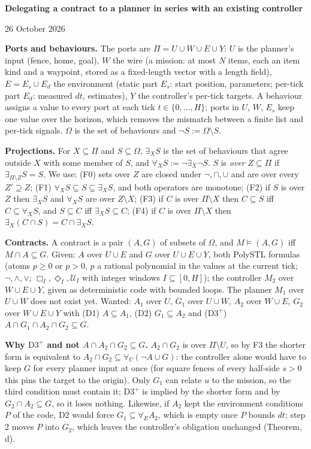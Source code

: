 \documentclass[10pt]{article}
\newcommand{\sect}[1]{\par\smallskip{\large\bfseries #1}\par\smallskip}
\newcommand{\ex}{\exists}
\newcommand{\fa}{\forall}
\newcommand{\Dthree}{\mathrm{D3}^{+}}
\begin{document}
\small
{\Large\bfseries Delegating a contract to a planner in series with an existing controller}\par 26 October 2026

\sect{1\quad Setting}

\textbf{Ports and behaviours.} The ports are $\Pi=U\cup W\cup E\cup Y$: $U$ is the planner's input (fence, home, goal), $W$ the wire (a mission: at most $N$ items, each an item kind and a waypoint, stored as a fixed-length vector with a length field), $E=E_s\cup E_d$ the environment (static part $E_s$: start position, parameters; per-tick part $E_d$: measured $dt$, estimates), $Y$ the controller's per-tick targets. A behaviour assigns a value to every port at each tick $t\in\{0,\dots,H\}$; ports in $U$, $W$, $E_s$ keep one value over the horizon, which removes the mismatch between a finite list and per-tick signals. $\Omega$ is the set of behaviours and $\lnot S:=\Omega\setminus S$.

\textbf{Projections.} For $X\subseteq\Pi$ and $S\subseteq\Omega$, $\ex_X S$ is the set of behaviours that agree outside $X$ with some member of $S$, and $\fa_X S:=\lnot\ex_X\lnot S$. $S$ is \emph{over} $Z\subseteq\Pi$ if $\ex_{\Pi\setminus Z}S=S$. We use: (F0) sets over $Z$ are closed under $\lnot,\cap,\cup$ and are over every $Z'\supseteq Z$; (F1) $\fa_X S\subseteq S\subseteq\ex_X S$, and both operators are monotone; (F2) if $S$ is over $Z$ then $\ex_X S$ and $\fa_X S$ are over $Z\setminus X$; (F3) if $C$ is over $\Pi\setminus X$ then $C\subseteq S$ iff $C\subseteq\fa_X S$, and $S\subseteq C$ iff $\ex_X S\subseteq C$; (F4) if $C$ is over $\Pi\setminus X$ then $\ex_X(C\cap S)=C\cap\ex_X S$.

\textbf{Contracts.} A contract is a pair $(A,G)$ of subsets of $\Omega$, and $M\models(A,G)$ iff $M\cap A\subseteq G$. Given: $A$ over $U\cup E$ and $G$ over $U\cup E\cup Y$, both PolySTL formulas (atoms $p\ge0$ or $p>0$, $p$ a rational polynomial in the values at the current tick; $\lnot,\wedge,\vee$; $\Box_I,\Diamond_I,\mathcal U_I$ with integer windows $I\subseteq[0,H]$); the controller $M_2$ over $W\cup E\cup Y$, given as deterministic code with bounded loops. The planner $M_1$ over $U\cup W$ does not exist yet. Wanted: $A_1$ over $U$, $G_1$ over $U\cup W$, $A_2$ over $W\cup E$, $G_2$ over $W\cup E\cup Y$ with (D1) $A\subseteq A_1$, (D2) $G_1\subseteq A_2$ and ($\Dthree$) $A\cap G_1\cap A_2\cap G_2\subseteq G$.

\textbf{Why $\Dthree$ and not $A\cap A_2\cap G_2\subseteq G$.} $A_2\cap G_2$ is over $\Pi\setminus U$, so by F3 the shorter form is equivalent to $A_2\cap G_2\subseteq\fa_U(\lnot A\cup G)$: the controller alone would have to keep $G$ for every planner input at once (for square fences of every half-side $s>0$ this pins the target to the origin). Only $G_1$ can relate $u$ to the mission, so the third condition must contain it; $\Dthree$ is implied by the shorter form and by $G_2\cap A_2\subseteq G$, so it loses nothing. Likewise, if $A_2$ kept the environment conditions $P$ of the code, D2 would force $G_1\subseteq\fa_E A_2$, which is empty once $P$ bounds $dt$; step 2 moves $P$ into $G_2$, which leaves the controller's obligation unchanged (Theorem, d).
\end{document}
